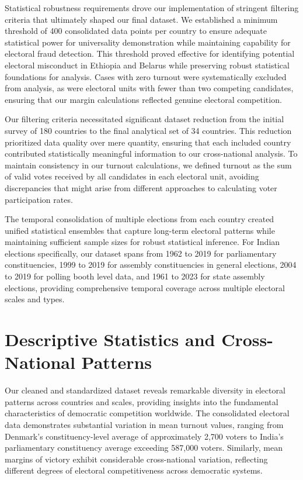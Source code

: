 Statistical robustness requirements drove our implementation of stringent filtering criteria that ultimately shaped our final dataset. We established a minimum threshold of 400 consolidated data points per country to ensure adequate statistical power for universality demonstration while maintaining capability for electoral fraud detection. This threshold proved effective for identifying potential electoral misconduct in Ethiopia and Belarus while preserving robust statistical foundations for analysis. Cases with zero turnout were systematically excluded from analysis, as were electoral units with fewer than two competing candidates, ensuring that our margin calculations reflected genuine electoral competition.

Our filtering criteria necessitated significant dataset reduction from the initial survey of 180 countries to the final analytical set of 34 countries. This reduction prioritized data quality over mere quantity, ensuring that each included country contributed statistically meaningful information to our cross-national analysis. To maintain consistency in our turnout calculations, we defined turnout as the sum of valid votes received by all candidates in each electoral unit, avoiding discrepancies that might arise from different approaches to calculating voter participation rates.

The temporal consolidation of multiple elections from each country created unified statistical ensembles that capture long-term electoral patterns while maintaining sufficient sample sizes for robust statistical inference. For Indian elections specifically, our dataset spans from 1962 to 2019 for parliamentary constituencies, 1999 to 2019 for assembly constituencies in general elections, 2004 to 2019 for polling booth level data, and 1961 to 2023 for state assembly elections, providing comprehensive temporal coverage across multiple electoral scales and types.

\section{Descriptive Statistics and Cross-National Patterns}

Our cleaned and standardized dataset reveals remarkable diversity in electoral patterns across countries and scales, providing insights into the fundamental characteristics of democratic competition worldwide. The consolidated electoral data demonstrates substantial variation in mean turnout values, ranging from Denmark's constituency-level average of approximately 2,700 voters to India's parliamentary constituency average exceeding 587,000 voters. Similarly, mean margins of victory exhibit considerable cross-national variation, reflecting different degrees of electoral competitiveness across democratic systems.

